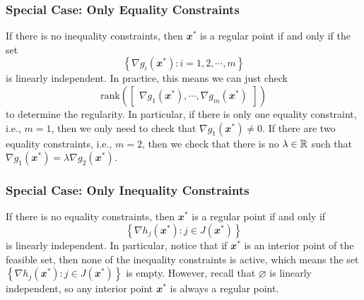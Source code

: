 \documentclass[math, code]{amznotes}
\theoremstyle{remark}
\begin{document}
\subsubsection{Special Case: Only Equality Constraints}
If there is no inequality constraints, then $\mathbfit{x}^*$ is a regular point if and only if the set 
\begin{equation*}
    \left\{\nabla g_i(\mathbfit{x}^*) \colon i = 1, 2, \cdots, m\right\}
\end{equation*}
is linearly independent. In practice, this means we can just check 
\begin{equation*}
    \mathrm{rank}\left(\begin{bmatrix}
        \nabla g_1(\mathbfit{x}^*), \cdots, \nabla g_m(\mathbfit{x}^*)
    \end{bmatrix}\right)
\end{equation*}
to determine the regularity. In particular, if there is only one equality constraint, i.e., $m = 1$, then we only need to check that $\nabla g_1(\mathbfit{x}^*) \neq \mathbfit{0}$. If there are two equality constraints, i.e., $m = 2$, then we check that there is no $\lambda \in \mathbb{R}$ such that $\nabla g_1(\mathbfit{x}^*) = \lambda \nabla g_2(\mathbfit{x}^*)$.

\subsubsection{Special Case: Only Inequality Constraints}
If there is no equality constraints, then $\mathbfit{x}^*$ is a regular point if and only if 
\begin{equation*}
    \left\{\nabla h_j(\mathbfit{x}^*) \colon j \in J(\mathbfit{x}^*)\right\}
\end{equation*}
is linearly independent. In particular, notice that if $\mathbfit{x}^*$ is an interior point of the feasible set, then none of the inequality constraints is active, which means the set $\left\{\nabla h_j(\mathbfit{x}^*) \colon j \in J(\mathbfit{x}^*)\right\}$ is empty. However, recall that $\varnothing$ is linearly independent, so any interior point $\mathbfit{x}^*$ is always a regular point.
\end{document}
